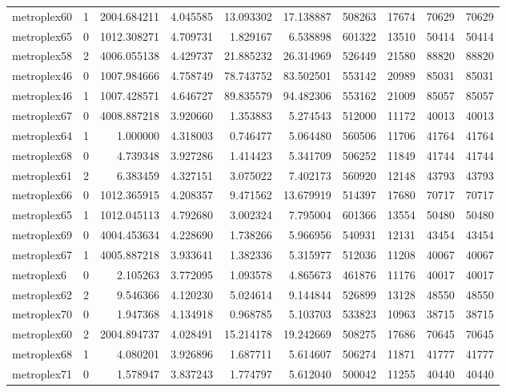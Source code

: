 \begin{longtable}{|l|r|r|r|r|r|r|r|r|r|}
metroplex60 & 1 & 2004.684211 & 4.045585 & 13.093302 & 17.138887 & 508263 & 17674 & 70629 & 70629 \\
metroplex65 & 0 & 1012.308271 & 4.709731 & 1.829167 & 6.538898 & 601322 & 13510 & 50414 & 50414 \\
metroplex58 & 2 & 4006.055138 & 4.429737 & 21.885232 & 26.314969 & 526449 & 21580 & 88820 & 88820 \\
metroplex46 & 0 & 1007.984666 & 4.758749 & 78.743752 & 83.502501 & 553142 & 20989 & 85031 & 85031 \\
metroplex46 & 1 & 1007.428571 & 4.646727 & 89.835579 & 94.482306 & 553162 & 21009 & 85057 & 85057 \\
metroplex67 & 0 & 4008.887218 & 3.920660 & 1.353883 & 5.274543 & 512000 & 11172 & 40013 & 40013 \\
metroplex64 & 1 & 1.000000 & 4.318003 & 0.746477 & 5.064480 & 560506 & 11706 & 41764 & 41764 \\
metroplex68 & 0 & 4.739348 & 3.927286 & 1.414423 & 5.341709 & 506252 & 11849 & 41744 & 41744 \\
metroplex61 & 2 & 6.383459 & 4.327151 & 3.075022 & 7.402173 & 560920 & 12148 & 43793 & 43793 \\
metroplex66 & 0 & 1012.365915 & 4.208357 & 9.471562 & 13.679919 & 514397 & 17680 & 70717 & 70717 \\
metroplex65 & 1 & 1012.045113 & 4.792680 & 3.002324 & 7.795004 & 601366 & 13554 & 50480 & 50480 \\
metroplex69 & 0 & 4004.453634 & 4.228690 & 1.738266 & 5.966956 & 540931 & 12131 & 43454 & 43454 \\
metroplex67 & 1 & 4005.887218 & 3.933641 & 1.382336 & 5.315977 & 512036 & 11208 & 40067 & 40067 \\
metroplex6 & 0 & 2.105263 & 3.772095 & 1.093578 & 4.865673 & 461876 & 11176 & 40017 & 40017 \\
metroplex62 & 2 & 9.546366 & 4.120230 & 5.024614 & 9.144844 & 526899 & 13128 & 48550 & 48550 \\
metroplex70 & 0 & 1.947368 & 4.134918 & 0.968785 & 5.103703 & 533823 & 10963 & 38715 & 38715 \\
metroplex60 & 2 & 2004.894737 & 4.028491 & 15.214178 & 19.242669 & 508275 & 17686 & 70645 & 70645 \\
metroplex68 & 1 & 4.080201 & 3.926896 & 1.687711 & 5.614607 & 506274 & 11871 & 41777 & 41777 \\
metroplex71 & 0 & 1.578947 & 3.837243 & 1.774797 & 5.612040 & 500042 & 11255 & 40440 & 40440 \\

\end{longtable}
